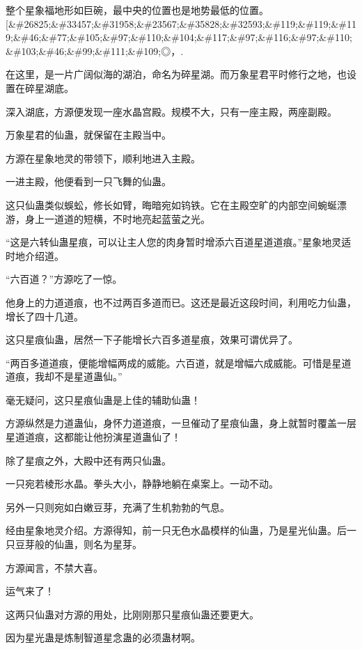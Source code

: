
\begin{this_body}

整个星象福地形如巨碗，最中央的位置也是地势最低的位置。[\&\#26825;\&\#33457;\&\#31958;\&\#23567;\&\#35828;\&\#32593;\&\#119;\&\#119;\&\#119;\&\#46;\&\#77;\&\#105;\&\#97;\&\#110;\&\#104;\&\#117;\&\#97;\&\#116;\&\#97;\&\#110;\&\#103;\&\#46;\&\#99;\&\#111;\&\#109;◎，.

在这里，是一片广阔似海的湖泊，命名为碎星湖。而万象星君平时修行之地，也设置在碎星湖底。

深入湖底，方源便发现一座水晶宫殿。规模不大，只有一座主殿，两座副殿。

万象星君的仙蛊，就保留在主殿当中。

方源在星象地灵的带领下，顺利地进入主殿。

一进主殿，他便看到一只飞舞的仙蛊。

这只仙蛊类似蜈蚣，修长如臂，晦暗宛如钨铁。它在主殿空旷的内部空间蜿蜒漂游，身上一道道的短横，不时地亮起蓝萤之光。

“这是六转仙蛊星痕，可以让主人您的肉身暂时增添六百道星道道痕。”星象地灵适时地介绍道。

“六百道？”方源吃了一惊。

他身上的力道道痕，也不过两百多道而已。这还是最近这段时间，利用吃力仙蛊，增长了四十几道。

这只星痕仙蛊，居然一下子能增长六百多道星痕，效果可谓优异了。

“两百多道道痕，便能增幅两成的威能。六百道，就是增幅六成威能。可惜是星道道痕，我却不是星道蛊仙。”

毫无疑问，这只星痕仙蛊是上佳的辅助仙蛊！

方源纵然是力道蛊仙，身怀力道道痕，一旦催动了星痕仙蛊，身上就暂时覆盖一层星道道痕，这都能让他扮演星道蛊仙了！

除了星痕之外，大殿中还有两只仙蛊。

一只宛若棱形水晶。拳头大小，静静地躺在桌案上。一动不动。

另外一只则宛如白嫩豆芽，充满了生机勃勃的气息。

经由星象地灵介绍。方源得知，前一只无色水晶模样的仙蛊，乃是星光仙蛊。后一只豆芽般的仙蛊，则名为星芽。

方源闻言，不禁大喜。

运气来了！

这两只仙蛊对方源的用处，比刚刚那只星痕仙蛊还要更大。

因为星光蛊是炼制智道星念蛊的必须蛊材啊。


\end{this_body}

